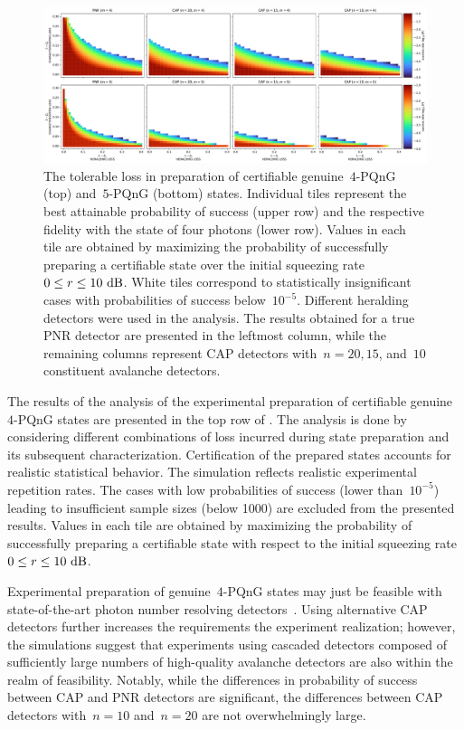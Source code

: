 \documentclass{article}
\begin{document}
\begin{figure}[h]
  \bgroup
    \hspace*{-0.125\columnwidth}%
    \includegraphics[width = 1.25 \columnwidth]{import/202504/paper_unified_merged_10dB-51.pdf}
  \egroup
  \caption{
    The tolerable loss in preparation of certifiable genuine~$4$-PQnG ({top}) and~$5$-PQnG ({bottom}) states. Individual tiles represent the best attainable probability of success (upper row) and the respective fidelity with the state of four photons (lower row). Values in each tile are obtained by maximizing the probability of successfully preparing a certifiable state over the initial squeezing rate~${0 \leq r \leq 10\ \mathrm{dB}}$. White tiles correspond to statistically insignificant cases with probabilities of success below~$10^{-5}$. Different heralding detectors were used in the analysis. The results obtained for a true PNR detector are presented in the leftmost column, while the remaining columns represent CAP detectors with~${n = 20, 15}$, and~$10$ constituent avalanche detectors.
  }
  \label{f-res-45}
\end{figure}

The results of the analysis of the experimental preparation of certifiable genuine~$4$-PQnG states are presented in the {top} row of . The analysis is done by considering different combinations of loss incurred during state preparation and its subsequent characterization. Certification of the prepared states accounts for realistic statistical behavior. The simulation reflects realistic experimental repetition rates. The cases with low probabilities of success (lower than~$10^{-5}$) leading to insufficient sample sizes (below 1000) are excluded from the presented results. Values in each tile are obtained by maximizing the probability of successfully preparing a certifiable state with respect to the initial squeezing rate~${0 \leq r \leq 10\ \mathrm{dB}}$.

Experimental preparation of genuine~$4$-PQnG states may just be feasible with state-of-the-art photon number resolving detectors~\cite{endo2021,endo2024}. Using alternative CAP detectors further increases the requirements  the experiment realization; however, the simulations suggest that experiments using cascaded detectors composed of sufficiently large numbers of high-quality avalanche detectors are also within the realm of feasibility. Notably, while the differences in probability of success between CAP and PNR detectors are significant, the differences between CAP detectors with~$n = 10$ and~$n = 20$ are not overwhelmingly large.
\end{document}
